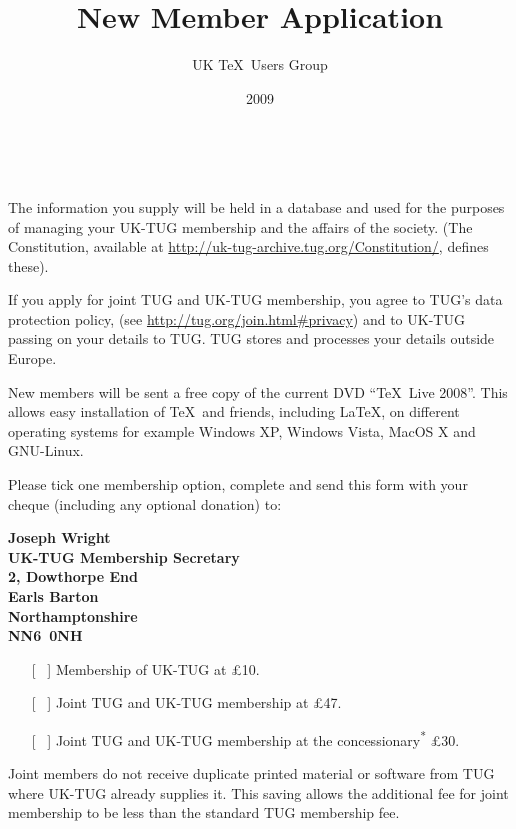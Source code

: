 \documentclass[a4paper,11pt]{article}
\title{New Member Application}
\author{UK \TeX\ Users Group}
\date{2009}
\begin{document}
\thispagestyle{empty}

\begin{minipage}{\textwidth}
  \makeatletter
  {\Large \@author}
  
  \smallskip
  
  {\large \@title\ \@date}
  
  \medskip
\end{minipage}

The information you supply will be held in a database and used
for the purposes of managing your UK-TUG membership and the 
affairs of the society. (The Constitution, available at
\url{http://uk-tug-archive.tug.org/Constitution/}, defines these).

If you apply for joint TUG and UK-TUG membership, you agree to 
TUG's data protection policy, (see 
\url{http://tug.org/join.html#privacy}) and to UK-TUG passing 
on your details to TUG. TUG stores and processes your details 
outside Europe.

New members will be sent a free copy of the current DVD ``\TeX\ 
Live 2008''. This allows easy installation of \TeX\ and friends, 
including \LaTeX, on different operating systems for example 
Windows XP, Windows Vista, MacOS X and GNU-Linux.  

Please tick one membership option, complete and send this form 
with your cheque (including any optional donation) to:

\begin{minipage}{\textwidth}
  \bfseries
  Joseph Wright\\
  UK-TUG Membership Secretary\\
  2, Dowthorpe End\\
  Earls Barton\\
  Northamptonshire\\
  NN6~0NH
\end{minipage}

\medskip

\begin{itemize}
  \item [[~]] Membership of UK-TUG at \pounds10.
  \item [[~]] Joint TUG and UK-TUG membership at \pounds47.
  \item [[~]] Joint TUG and UK-TUG membership at the 
    concessionary\textsuperscript{*} \pounds30.
\end{itemize} 
Joint members do not receive duplicate printed material or
software from TUG where UK-TUG already supplies it. This saving
allows the additional fee for joint membership to be less than the
standard TUG membership fee.
\end{document}
